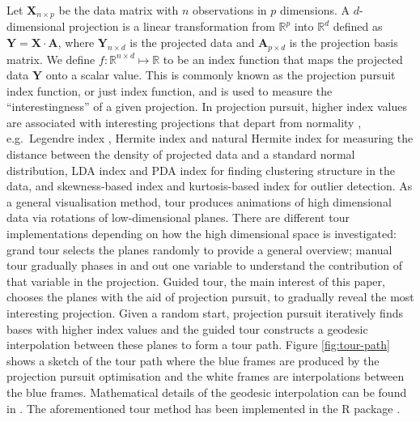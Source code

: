Let \(\mathbf{X}_{n \times p}\) be the data matrix with \(n\)
observations in \(p\) dimensions. A \(d\)-dimensional projection is a
linear transformation from \(\mathbb{R}^p\) into \(\mathbb{R}^d\)
defined as \(\mathbf{Y} = \mathbf{X} \cdot \mathbf{A}\), where
\(\mathbf{Y}_{n \times d}\) is the projected data and
\(\mathbf{A}_{p\times d}\) is the projection basis matrix. We define
\(f: \mathbb{R}^{n \times d} \mapsto \mathbb{R}\) to be an index
function that maps the projected data \(\mathbf{Y}\) onto a scalar
value. This is commonly known as the projection pursuit index function,
or just index function, and is used to measure the ``interestingness''
of a given projection. In projection pursuit, higher index values are
associated with interesting projections that depart from normality
\citep{diaconis1984asymptotics, huber1985projection}, e.g.~Legendre
index \citep{friedman1974projection}, Hermite index
\citep{hall1989polynomial} and natural Hermite index
\citep{cook1993projection} for measuring the distance between the
density of projected data and a standard normal distribution, LDA index
\citep{lee2005projection} and PDA index \citep{lee2010projection} for
finding clustering structure in the data, and skewness-based index
\citep{Loperfido2018} and kurtosis-based index \citep{Loperfido2020} for
outlier detection. As a general visualisation method, tour produces
animations of high dimensional data via rotations of low-dimensional
planes. There are different tour implementations depending on how the
high dimensional space is investigated: grand tour \citep{cook2008grand}
selects the planes randomly to provide a general overview; manual tour
\citep{cook1997manual} gradually phases in and out one variable to
understand the contribution of that variable in the projection. Guided
tour, the main interest of this paper, chooses the planes with the aid
of projection pursuit, to gradually reveal the most interesting
projection. Given a random start, projection pursuit iteratively finds
bases with higher index values and the guided tour constructs a geodesic
interpolation between these planes to form a tour path. Figure
\ref{fig:tour-path} shows a sketch of the tour path where the blue
frames are produced by the projection pursuit optimisation and the white
frames are interpolations between the blue frames. Mathematical details
of the geodesic interpolation can be found in
\citet{buja2005computational}. The aforementioned tour method has been
implemented in the R package  \citep{tourr}.

